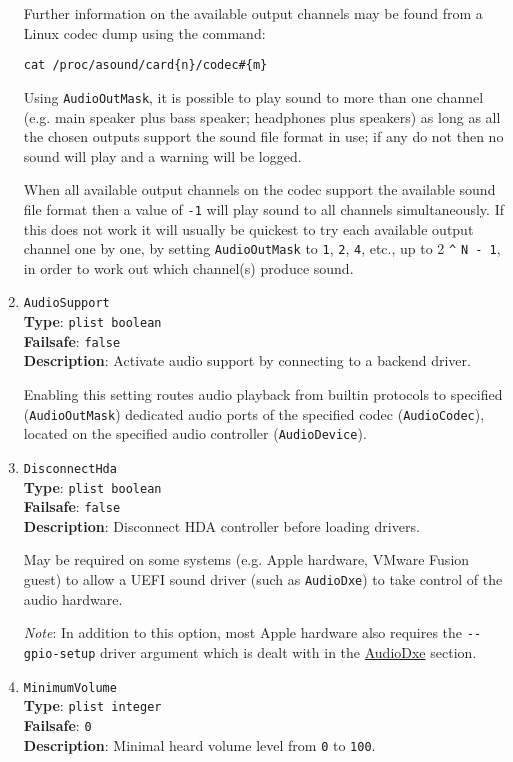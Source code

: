 \documentclass[]{article}
\begin{document}
\begin{enumerate}
  Further information on the available output channels may be found from a Linux codec dump using the command:
  
  \texttt{cat /proc/asound/card\{n\}/codec\#\{m\}}
  
  Using \texttt{AudioOutMask}, it is possible to play sound to more than one channel (e.g. main speaker plus bass speaker;
  headphones plus speakers) as long as all the chosen outputs support the sound file format in use; if any do not then no
  sound will play and a warning will be logged.

  When all available output channels on the codec support the available sound file format then a value
  of \texttt{-1} will play sound to all channels simultaneously. If this does not work it will usually be quickest
  to try each available output channel one by one, by setting \texttt{AudioOutMask} to \texttt{1}, \texttt{2},
  \texttt{4}, etc., up to 2 \texttt{\^{}} \texttt{N - 1}, in order to work out which channel(s) produce sound.

  \item
  \texttt{AudioSupport}\\
  \textbf{Type}: \texttt{plist\ boolean}\\
  \textbf{Failsafe}: \texttt{false}\\
  \textbf{Description}: Activate audio support by connecting to a backend driver.

  Enabling this setting routes audio playback from builtin protocols to specified
  (\texttt{AudioOutMask}) dedicated audio ports of the specified codec (\texttt{AudioCodec}),
  located on the specified audio controller (\texttt{AudioDevice}).

  \item
  \texttt{DisconnectHda}\\
  \textbf{Type}: \texttt{plist\ boolean}\\
  \textbf{Failsafe}: \texttt{false}\\
  \textbf{Description}: Disconnect HDA controller before loading drivers.

  May be required on some systems (e.g. Apple hardware, VMware Fusion guest) to allow
  a UEFI sound driver (such as \texttt{AudioDxe}) to take control of the audio hardware.

  \emph{Note}: In addition to this option, most Apple hardware also requires the
  \texttt{-{}-gpio-setup} driver argument which is dealt with in the
  \hyperref[uefiaudio]{AudioDxe} section.

\item
  \texttt{MinimumVolume}\\
  \textbf{Type}: \texttt{plist\ integer}\\
  \textbf{Failsafe}: \texttt{0}\\
  \textbf{Description}: Minimal heard volume level from \texttt{0} to \texttt{100}.


\end{enumerate}
\end{document}
